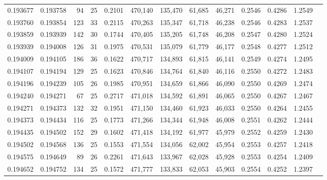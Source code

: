 \begin{tabular}{rrrrrrrrrrrrr}
0.193677 & 0.193758 &  94 &  25 &                                     0.2101 & 470,140 & 135,470 &  61,685 &  46,271 & 0.2546 & 0.4286 & 1.2549 \\
0.193760 & 0.193854 & 123 &  33 &                                     0.2115 & 470,263 & 135,347 &  61,718 &  46,238 & 0.2546 & 0.4283 & 1.2537 \\
0.193859 & 0.193939 & 142 &  30 &                                     0.1744 & 470,405 & 135,205 &  61,748 &  46,208 & 0.2547 & 0.4280 & 1.2524 \\
0.193939 & 0.194008 & 126 &  31 &                                     0.1975 & 470,531 & 135,079 &  61,779 &  46,177 & 0.2548 & 0.4277 & 1.2512 \\
0.194009 & 0.194105 & 186 &  36 &                                     0.1622 & 470,717 & 134,893 &  61,815 &  46,141 & 0.2549 & 0.4274 & 1.2495 \\
0.194107 & 0.194194 & 129 &  25 &                                     0.1623 & 470,846 & 134,764 &  61,840 &  46,116 & 0.2550 & 0.4272 & 1.2483 \\
0.194196 & 0.194239 & 105 &  26 &                                     0.1985 & 470,951 & 134,659 &  61,866 &  46,090 & 0.2550 & 0.4269 & 1.2474 \\
0.194240 & 0.194271 &  67 &  25 &                                     0.2717 & 471,018 & 134,592 &  61,891 &  46,065 & 0.2550 & 0.4267 & 1.2467 \\
0.194271 & 0.194373 & 132 &  32 &                                     0.1951 & 471,150 & 134,460 &  61,923 &  46,033 & 0.2550 & 0.4264 & 1.2455 \\
0.194373 & 0.194434 & 116 &  25 &                                     0.1773 & 471,266 & 134,344 &  61,948 &  46,008 & 0.2551 & 0.4262 & 1.2444 \\
0.194435 & 0.194502 & 152 &  29 &                                     0.1602 & 471,418 & 134,192 &  61,977 &  45,979 & 0.2552 & 0.4259 & 1.2430 \\
0.194502 & 0.194568 & 136 &  25 &                                     0.1553 & 471,554 & 134,056 &  62,002 &  45,954 & 0.2553 & 0.4257 & 1.2418 \\
0.194575 & 0.194649 &  89 &  26 &                                     0.2261 & 471,643 & 133,967 &  62,028 &  45,928 & 0.2553 & 0.4254 & 1.2409 \\
0.194652 & 0.194752 & 134 &  25 &                                     0.1572 & 471,777 & 133,833 &  62,053 &  45,903 & 0.2554 & 0.4252 & 1.2397 \\

\end{tabular}
